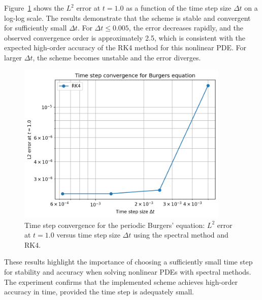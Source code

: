 \documentclass{article}
\begin{document}
Figure~\ref{fig:burgers_dt_convergence} shows the $L^2$ error at $t=1.0$ as a function of the time step size $\Delta t$ on a log-log scale. The results demonstrate that the scheme is stable and convergent for sufficiently small $\Delta t$. For $\Delta t \leq 0.005$, the error decreases rapidly, and the observed convergence order is approximately 2.5, which is consistent with the expected high-order accuracy of the RK4 method for this nonlinear PDE. For larger $\Delta t$, the scheme becomes unstable and the error diverges.

\begin{figure}[htbp]
    \centering
    \includegraphics[width=0.9\textwidth]{figure/burgers_dt_convergence.png}
    \caption{Time step convergence for the periodic Burgers' equation: $L^2$ error at $t=1.0$ versus time step size $\Delta t$ using the spectral method and RK4.}
    \label{fig:burgers_dt_convergence}
\end{figure}

These results highlight the importance of choosing a sufficiently small time step for stability and accuracy when solving nonlinear PDEs with spectral methods. The experiment confirms that the implemented scheme achieves high-order accuracy in time, provided the time step is adequately small.
\end{document}
